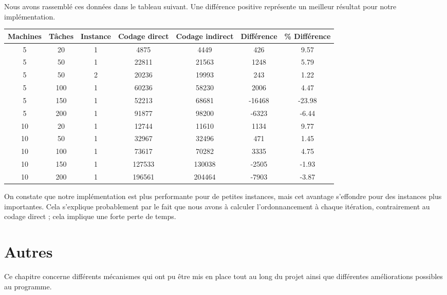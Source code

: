 \documentclass[hideweeklyreports]{polytech/polytech}
\begin{document}
			Nous avons rassemblé ces données dans le tableau suivant. Une différence positive représente un meilleur résultat pour notre implémentation.

			\begin{centering}
				\begin{tabularx}{\textwidth}{|c|c|c||c|c||c|c|}
					\hline
					Machines & Tâches & Instance & Codage direct & Codage indirect & Différence & \% Différence\\\hline\hline\endhead
					5 & 20 & 1 & 4875 & 4449 & 426 & 9.57\\\hline
					5 & 50 & 1 & 22811 & 21563 & 1248 & 5.79\\\hline
					5 & 50 & 2 & 20236 & 19993 & 243 & 1.22\\\hline
					5 & 100 & 1 & 60236 & 58230 & 2006 & 4.47\\\hline
					5 & 150 & 1 & 52213 & 68681 & -16468 & -23.98\\\hline
					5 & 200 & 1 & 91877 & 98200 & -6323 & -6.44\\\hline
					10 & 20 & 1 & 12744 & 11610 & 1134 & 9.77\\\hline
					10 & 50 & 1 & 32967 & 32496 & 471 & 1.45\\\hline
					10 & 100 & 1 & 73617 & 70282 & 3335 & 4.75\\\hline
					10 & 150 & 1 & 127533 & 130038 & -2505 & -1.93\\\hline
					10 & 200 & 1 & 196561 & 204464 & -7903 & -3.87\\\hline
				\end{tabularx}
			\end{centering}
			
			On constate que notre implémentation est plus performante pour de petites instances, mais cet avantage s'effondre pour des instances plus importantes. Cela s'explique probablement par le fait que nous avons à calculer l'ordonnancement à chaque itération, contrairement au codage direct ; cela implique une forte perte de temps.
	
	\chapter{Autres}
		Ce chapitre concerne différents mécanismes qui ont pu être mis en place tout au long du projet ainsi que différentes améliorations possibles au programme.
		
\end{document}

